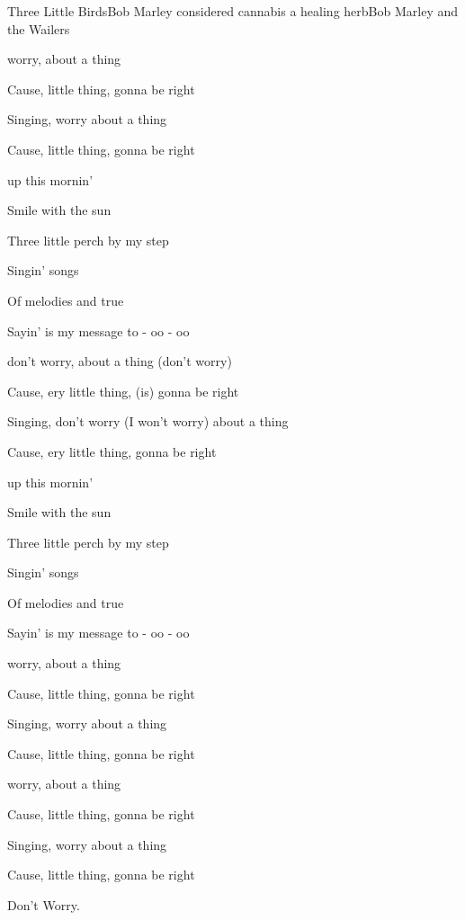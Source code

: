\begin{SBSong}{Three Little Birds}{Bob Marley considered cannabis a healing herb}{Bob Marley and the Wailers}
  \begin{SBChorus}
    worry, about a thing

   Cause,  little thing, gonna be right

   Singing,  worry about a thing

   Cause,  little thing, gonna be right
  \end{SBChorus}
  \begin{SBVerse}
    up this mornin'

   Smile with the  sun

   Three little  perch by my step

   Singin'  songs

   Of melodies  and true

   Sayin'  is my message to  - oo - oo
  \end{SBVerse}
  \begin{SBChorus}
   
    don't worry, about a thing (don't worry)

   Cause, ery little thing, (is) gonna be right

   Singing, don't worry (I won't worry) about a thing

   Cause, ery little thing, gonna be right
  \end{SBChorus}
  \begin{SBVerse}
    up this mornin'

   Smile with the  sun

   Three little  perch by my step

   Singin'  songs

   Of melodies  and true

   Sayin'  is my message to  - oo - oo
  \end{SBVerse}
  \CBPageBrk
  \begin{SBChorus}
    worry, about a thing

   Cause,  little thing, gonna be right

   Singing,  worry about a thing

   Cause,  little thing, gonna be right
  \end{SBChorus}
  \begin{SBChorus}
    worry, about a thing

   Cause,  little thing, gonna be right

   Singing,  worry about a thing

   Cause,  little thing, gonna be right  
   
   Don't Worry.
  \end{SBChorus}
\end{SBSong}
